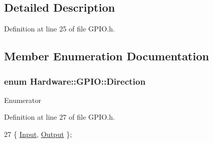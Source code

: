 \subsection{Detailed Description}


Definition at line 25 of file G\+P\+I\+O.\+h.



\subsection{Member Enumeration Documentation}
\hypertarget{class_hardware_1_1_g_p_i_o_a7507431d6341c146f22dcdb21b78ffd4}{}
\subsubsection[{Direction}]{\setlength{\rightskip}{0pt plus 5cm}enum {\bf Hardware\+::\+G\+P\+I\+O\+::\+Direction}}\label{class_hardware_1_1_g_p_i_o_a7507431d6341c146f22dcdb21b78ffd4}
\begin{Desc}
\item[Enumerator]\par
\begin{description}
\item[{\em 
\hypertarget{class_hardware_1_1_g_p_i_o_a7507431d6341c146f22dcdb21b78ffd4a5614339496b61db558bd9a26a327088e}{}Input\label{class_hardware_1_1_g_p_i_o_a7507431d6341c146f22dcdb21b78ffd4a5614339496b61db558bd9a26a327088e}
}]\item[{\em 
\hypertarget{class_hardware_1_1_g_p_i_o_a7507431d6341c146f22dcdb21b78ffd4a72432a9b39a6e45297b1158da8bb60eb}{}Output\label{class_hardware_1_1_g_p_i_o_a7507431d6341c146f22dcdb21b78ffd4a72432a9b39a6e45297b1158da8bb60eb}
}]\end{description}
\end{Desc}


Definition at line 27 of file G\+P\+I\+O.\+h.


\begin{DoxyCode}
27 \{ \hyperlink{class_hardware_1_1_g_p_i_o_a7507431d6341c146f22dcdb21b78ffd4a5614339496b61db558bd9a26a327088e}{Input}, \hyperlink{class_hardware_1_1_g_p_i_o_a7507431d6341c146f22dcdb21b78ffd4a72432a9b39a6e45297b1158da8bb60eb}{Output} \};
\end{DoxyCode}
\hypertarget{class_hardware_1_1_g_p_i_o_a9a7595aabdac9aec75f22e8b86342162}{}
